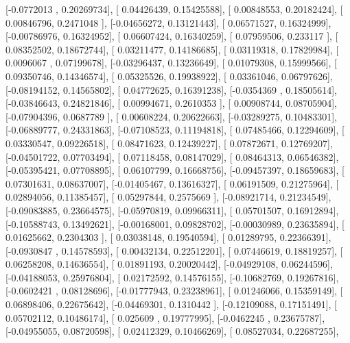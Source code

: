 \documentclass{article}
\begin{document}
       [-0.0772013 ,  0.20269734],
       [ 0.04426439,  0.15425588],
       [ 0.00848553,  0.20182424],
       [ 0.00846796,  0.2471048 ],
       [-0.04656272,  0.13121443],
       [ 0.06571527,  0.16324999],
       [-0.00786976,  0.16324952],
       [ 0.06607424,  0.16340259],
       [ 0.07959506,  0.233117  ],
       [ 0.08352502,  0.18672744],
       [ 0.03211477,  0.14186685],
       [ 0.03119318,  0.17829984],
       [ 0.0096067 ,  0.07199678],
       [-0.03296437,  0.13236649],
       [ 0.01079308,  0.15999566],
       [ 0.09350746,  0.14346574],
       [ 0.05325526,  0.19938922],
       [ 0.03361046,  0.06797626],
       [-0.08194152,  0.14565802],
       [ 0.04772625,  0.16391238],
       [-0.0354369 ,  0.18505614],
       [-0.03846643,  0.24821846],
       [ 0.00994671,  0.2610353 ],
       [ 0.00908744,  0.08705904],
       [-0.07904396,  0.0687789 ],
       [ 0.00608224,  0.20622663],
       [-0.03289275,  0.10483301],
       [-0.06889777,  0.24331863],
       [-0.07108523,  0.11194818],
       [ 0.07485466,  0.12294609],
       [ 0.03330547,  0.09226518],
       [ 0.08471623,  0.12439227],
       [ 0.07872671,  0.12769207],
       [-0.04501722,  0.07703494],
       [ 0.07118458,  0.08147029],
       [ 0.08464313,  0.06546382],
       [-0.05395421,  0.07708895],
       [ 0.06107799,  0.16668756],
       [-0.09457397,  0.18659683],
       [ 0.07301631,  0.08637007],
       [-0.01405467,  0.13616327],
       [ 0.06191509,  0.21275964],
       [ 0.02894056,  0.11385457],
       [ 0.05297844,  0.2575669 ],
       [-0.08921714,  0.21234549],
       [-0.09083885,  0.23664575],
       [-0.05970819,  0.09966311],
       [ 0.05701507,  0.16912894],
       [-0.10588743,  0.13492621],
       [-0.00168001,  0.09828702],
       [-0.00030989,  0.23635894],
       [ 0.01625662,  0.2304303 ],
       [ 0.03038148,  0.19540594],
       [ 0.01289795,  0.22366391],
       [-0.0930847 ,  0.14578593],
       [ 0.00432134,  0.22512201],
       [ 0.07446619,  0.18819257],
       [ 0.06258208,  0.14636554],
       [ 0.01891193,  0.20020442],
       [-0.04929108,  0.06244596],
       [-0.04188053,  0.25976804],
       [ 0.02172592,  0.14576155],
       [-0.10682769,  0.19267816],
       [-0.0602421 ,  0.08128696],
       [-0.01777943,  0.23238961],
       [ 0.01246066,  0.15359149],
       [ 0.06898406,  0.22675642],
       [-0.04469301,  0.1310442 ],
       [-0.12109088,  0.17151491],
       [ 0.05702112,  0.10486174],
       [ 0.025609  ,  0.19777995],
       [-0.0462245 ,  0.23675787],
       [-0.04955055,  0.08720598],
       [ 0.02412329,  0.10466269],
       [ 0.08527034,  0.22687255],
\end{document}
